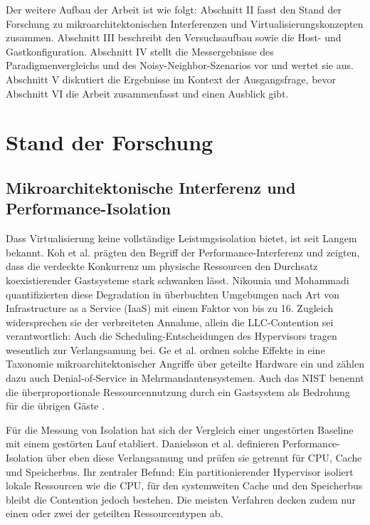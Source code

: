 \documentclass[conference]{IEEEtran}
\begin{document}
Der weitere Aufbau der Arbeit ist wie folgt: Abschnitt II fasst den Stand der Forschung zu mikroarchitektonischen Interferenzen und Virtualisierungskonzepten zusammen. Abschnitt III beschreibt den Versuchsaufbau sowie die Host- und Gastkonfiguration. Abschnitt IV stellt die Messergebnisse des Paradigmenvergleichs und des Noisy-Neighbor-Szenarios vor und wertet sie aus. Abschnitt V diskutiert die Ergebnisse im Kontext der Ausgangsfrage, bevor Abschnitt VI die Arbeit zusammenfasst und einen Ausblick gibt.

\section{Stand der Forschung}
\label{sec:related}

\subsection{Mikroarchitektonische Interferenz und Performance-Isolation}
Dass Virtualisierung keine vollständige Leistungsisolation bietet, ist seit Langem bekannt. Koh et al. \cite{koh2007analysis} prägten den Begriff der Performance-Interferenz und zeigten, dass die verdeckte Konkurrenz um physische Ressourcen den Durchsatz koexistierender Gastsysteme stark schwanken lässt. Nikounia und Mohammadi \cite{nikounia2018hypervisor} quantifizierten diese Degradation in überbuchten Umgebungen nach Art von Infrastructure as a Service (IaaS) mit einem Faktor von bis zu 16. Zugleich widersprechen sie der verbreiteten Annahme, allein die LLC-Contention sei verantwortlich: Auch die Scheduling-Entscheidungen des Hypervisors tragen wesentlich zur Verlangsamung bei. Ge et al. \cite{ge2018survey} ordnen solche Effekte in eine Taxonomie mikroarchitektonischer Angriffe über geteilte Hardware ein und zählen dazu auch Denial-of-Service in Mehrmandantensystemen. Auch das NIST benennt die überproportionale Ressourcennutzung durch ein Gastsystem als Bedrohung für die übrigen Gäste \cite{nist2018hypervisor}.

Für die Messung von Isolation hat sich der Vergleich einer ungestörten Baseline mit einem gestörten Lauf etabliert. Danielsson et al. \cite{danielsson2019testing} definieren Performance-Isolation über eben diese Verlangsamung und prüfen sie getrennt für CPU, Cache und Speicherbus. Ihr zentraler Befund: Ein partitionierender Hypervisor isoliert lokale Ressourcen wie die CPU, für den systemweiten Cache und den Speicherbus bleibt die Contention jedoch bestehen. Die meisten Verfahren decken zudem nur einen oder zwei der geteilten Ressourcentypen ab.
\end{document}
